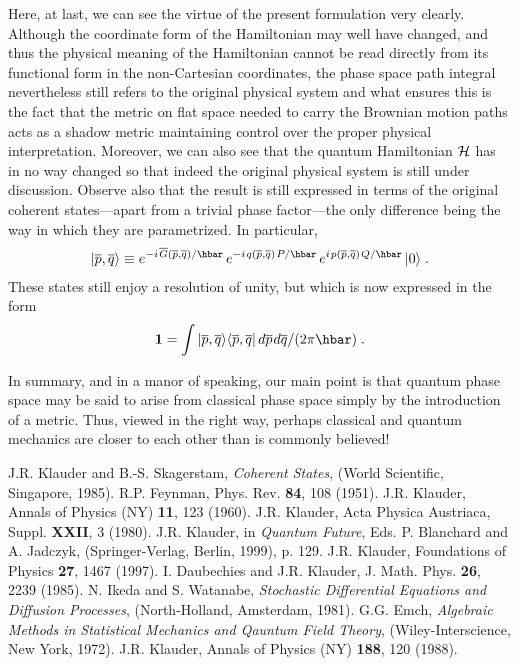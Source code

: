 \documentclass[12pt]{article}
\def\one{\mathbf 1}
\def\H{{\cal H}}
\def\s{\hskip.08em}
\def\o{\overline}
\def\bn{\begin{eqnarray}}     %
\def\en{\end{eqnarray}}       %
\def\<{\langle}
\def\>{\rangle}
\begin{document}
Here, at last, we can see the virtue of the present formulation very 
clearly. Although the coordinate form of the Hamiltonian may well have 
changed, and thus the physical meaning of the Hamiltonian cannot be read 
directly from its functional form in the non-Cartesian coordinates, the 
phase space path integral nevertheless still refers to the original 
physical system and what ensures this is the fact that the metric on 
flat space needed to carry the Brownian motion paths acts as a shadow 
metric maintaining control over the proper physical interpretation. 
Moreover, we can also see that the quantum Hamiltonian $\H$ has in no 
way changed so that indeed the original physical system is still under 
discussion. Observe also that the result is still expressed in terms of 
the original coherent states---apart from a trivial phase factor---the 
only difference being the way in which they are parametrized. In particular,
  \bn |{\o p},{\o q}\>\equiv e^{-i\s {\o G}({\o p},{\o q})/\hbar}\,
e^{-i\s q({\o p},{\o q})\s P/\hbar}\,e^{i\s p({\o p},{\o q})\s 
Q/\hbar}\,|0\>\;. \en 
These states still enjoy a resolution of unity, but which is now 
expressed in the form
  \bn  \one=\int |{\o p},{\o q}\>\<{\o p},{\o q}|\,d{\o p}\s 
d{\o q}/(2\pi\hbar)\;. \en

In summary, and in a manor of speaking, our main point is that quantum 
phase space may be said to arise from classical phase space simply by 
the introduction of a metric. Thus, viewed in the right way, perhaps 
classical and quantum mechanics are closer to each other than is 
commonly believed!


\begin{thebibliography}{99}
 J.R. Klauder and B.-S. Skagerstam, {\it Coherent States}, 
(World Scientific, Singapore, 1985).
R.P. Feynman, Phys. Rev. {\bf 84}, 108 (1951).
J.R. Klauder, Annals of Physics (NY) {\bf 11}, 123 (1960).
J.R. Klauder, Acta Physica Austriaca, Suppl. {\bf XXII}, 3 
(1980). 
J.R. Klauder, in {\it Quantum Future}, Eds. P. Blanchard and 
A. Jadczyk, (Springer-Verlag, Berlin, 1999), p. 129. 
J.R. Klauder, Foundations of Physics {\bf 27}, 1467 (1997).
I. Daubechies and J.R. Klauder, J. Math. Phys. {\bf 26}, 2239 
(1985). 
N. Ikeda and S. Watanabe, {\it Stochastic Differential 
Equations and Diffusion Processes}, (North-Holland, Amsterdam, 1981).
G.G. Emch, {\it Algebraic Methods in Statistical Mechanics 
and Qauntum Field Theory}, (Wiley-Interscience, New York, 1972).
J.R. Klauder, Annals of Physics (NY) {\bf 188}, 120 (1988).

\end{thebibliography}
\end{document}
